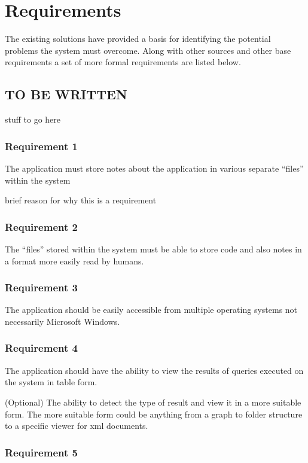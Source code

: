 \chapter{Requirements}\label{requirements}

The existing solutions have provided a basis for identifying the
potential problems the system must overcome. Along with other sources
and other base requirements a set of more formal requirements are listed
below.
\section{TO BE WRITTEN}

  stuff to go here

\subsection{Requirement 1}\label{requirement-1}

The application must store notes about the application in various
separate ``files'' within the system

brief reason for why this is a requirement

\subsection{Requirement 2}\label{requirement-2}
The ``files'' stored within the system must be able to store code and also
notes in a format more easily read by humans.

\subsection{Requirement 3}\label{requirement-3}
The application should be easily accessible from multiple operating systems
not necessarily Microsoft Windows.

\subsection{Requirement 4}\label{requirement-4}
The application should have the ability to view the results of queries executed on the
system in table form.

(Optional) The ability to detect the type of result and view it in a
more suitable form. The more suitable form could be anything from a
graph to folder structure to a specific viewer for xml documents.

\subsection{Requirement 5}\label{requirement-5}

